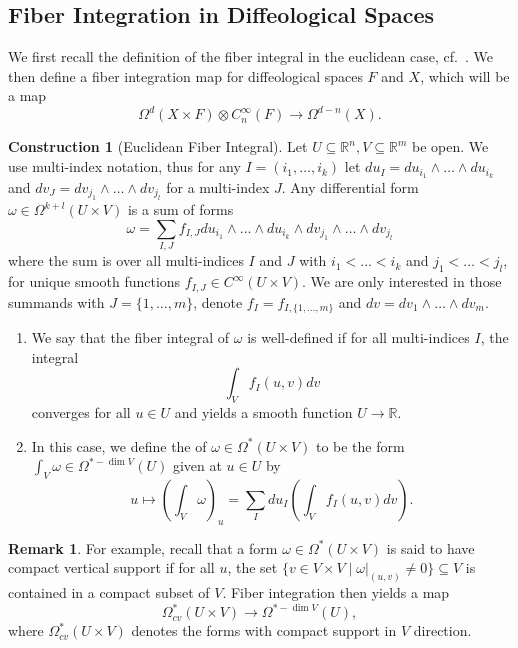 \documentclass{scrartcl}
\let\emph\relax
\theoremstyle{plain}
\theoremstyle{definition}
\newtheorem{remark}[theorem]{Remark}
\newtheorem{construction}[theorem]{Construction}
\newcommand{\R}{\mathbb R}
\renewcommand{\subset}{\subseteq}
\begin{document}



\subsection{Fiber Integration in Diffeological Spaces}\label{subsec:fiber-integration}
We first recall the definition of the fiber integral in the euclidean case, cf.\ \cite{bott1982differential}. We then define a fiber integration map for diffeological spaces $F$ and $X$, which will be a map
$$\Omega^d(X\times F) \otimes C_n^\infty(F)\to\Omega^{d-n}(X).$$

\begin{construction} [Euclidean Fiber Integral]

    Let $U\subset \R^n, V\subset\R^m$ be open. We use multi-index notation, thus for any $I=(i_1, \dots, i_k)$ let $du_I = du_{i_1}\wedge\dots \wedge du_{i_k}$ and  $dv_J=dv_{j_1}\wedge\dots\wedge dv_{j_l}$ for a multi-index $J$. Any differential form $\omega\in\Omega^{k+l}(U\times V)$ is a sum of forms $$\omega = \sum_{I, J} f_{I, J} du_{i_1}\wedge\dots \wedge du_{i_k}\wedge dv_{j_1}\wedge\dots\wedge dv_{j_l}$$ where the sum is over all multi-indices $I$ and $J$ with $i_1<\dots<i_k$ and $j_1<\dots<j_l$, for unique smooth functions $f_{I,J}\in C^\infty(U\times V)$. We are only interested in those summands with $J=\{1, \dots, m\}$, denote $f_I = f_{I, \{1, \dots, m\}}$ and $dv = dv_1\wedge\dots\wedge dv_m$. 
    \begin{enumerate}
    \item We say that the fiber integral of $\omega$ is well-defined if for all  multi-indices $I$, the integral $$\int_V f_{I}(u, v) dv$$ converges for all $u\in U$ and yields a smooth function $U\to \R$. 
    
    \item In this case, we define the \emph{fiber integral} of $\omega\in \Omega^*(U\times V)$ to be the form $\int_V \omega\in\Omega^{*-\dim V}(U)$ given at $u\in U$ by
    $$u\mapsto \left(\int_V \omega\right)_u = \sum_I du_I \left(\int_V f_{I}(u, v) dv\right).$$
    \end{enumerate}
\end{construction}
\begin{remark}
For example, recall that a form $\omega\in \Omega^*(U\times V)$ is said to have  compact vertical support if for all $u$, the set $\{v\in V\times V\mid \omega|_{(u, v)}\neq 0\}\subset V$ is contained in a compact subset of $V$. Fiber integration then yields a map $$\Omega^*_{cv}(U\times V)\to \Omega^{*-\dim V}(U),$$ where $\Omega^*_{cv}(U\times V)$ denotes the forms with compact support in $V$ direction. 
\end{remark}
\end{document}
